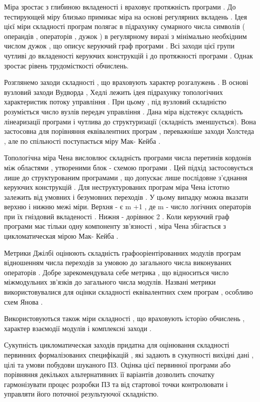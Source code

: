 Міра зростає з глибиною вкладеності і враховує протяжність програми . До тестирующей міру близько примикає міра на основі регулярних вкладень . Ідея цієї міри складності програм полягає в підрахунку сумарного числа символів ( операндів , операторів , дужок ) в регулярному виразі з мінімально необхідним числом дужок , що описує керуючий граф програми . Всі заходи цієї групи чутливі до вкладеності керуючих конструкцій і до протяжності програми . Однак зростає рівень трудомісткості обчислень.

Розглянемо заходи складності , що враховують характер розгалужень . В основі вузловий заходи Вудворда , Хедлі лежить ідея підрахунку топологічних характеристик потоку управління . При цьому , під вузловий складністю розуміється число вузлів передач управління . Дана міра відстежує складність лінеаризації програми і чутлива до структуризації (складність зменшується). Вона застосовна для порівняння еквівалентних програм , переважніше заходи Холстеда , але по спільності поступається міру Мак- Кейба .

Топологічна міра Чена висловлює складність програми числа перетинів кордонів між областями , утвореними блок - схемою програми . Цей підхід застосовується лише до структурованим програмами , що допускає лише послідовне з'єднання керуючих конструкцій . Для неструктурованих програм міра Чена істотно залежить від умовних і безумовних переходів . У цьому випадку можна вказати верхню і нижню межі міри. Верхня - є m +1 , де m - число логічних операторів при їх гніздовий вкладеності . Нижня - дорівнює 2 . Коли керуючий граф програми має тільки одну компоненту зв'язності , міра Чена збігається з цикломатическая мірою Мак- Кейба .

Метрики Джілбі оцінюють складність графооріентірованних модулів програм відношенням числа переходів за умовою до загального числа виконуваних операторів . Добре зарекомендувала себе метрика , що відноситься число міжмодульних зв'язків до загального числа модулів. Названі метрики використовувалися для оцінки складності еквівалентних схем програм , особливо схем Янова .

Використовуються також міри складності , що враховують історію обчислень , характер взаємодії модулів і комплексні заходи .

Сукупність цикломатическая заходів придатна для оцінювання складності первинних формалізованих специфікацій , які задають в сукупності вихідні дані , цілі та умови побудови шуканого ПЗ. Оцінка цієї первинної програми або порівняння декількох альтернативних її варіантів дозволить спочатку гармонізувати процес розробки ПЗ та від стартової точки контролювати і управляти його поточної результуючої складністю.

